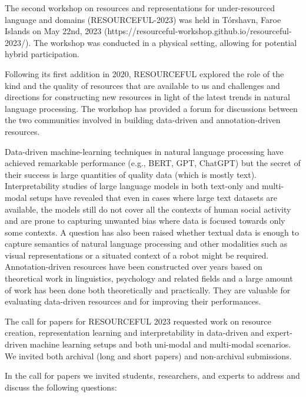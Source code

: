 The second workshop on resources and representations for under-resourced language and domains (RESOURCEFUL-2023) was held in Tórshavn, Faroe Islands on May 22nd, 2023 (https://resourceful-workshop.github.io/resourceful-2023/). The workshop was conducted in a physical setting, allowing for potential hybrid participation.

Following its first addition in 2020, RESOURCEFUL explored the role of the kind and the quality of resources that are available to us and challenges and directions for constructing new resources in light of the latest trends in natural language processing. The workshop has provided a forum for discussions between the two communities involved in building data-driven and annotation-driven resources. 

Data-driven machine-learning techniques in natural language processing have achieved remarkable performance (e.g., BERT, GPT, ChatGPT) but the secret of  their success is large quantities of quality data (which is mostly text). Interpretability studies of large language models in both text-only and multi-modal setups have revealed that even in cases where large text datasets are available, the models still do not cover all the contexts of human social activity and are prone to capturing unwanted bias where data is focused towards only some contexts. A question has also been raised whether textual data is enough to capture semantics of natural language processing and other modalities such as visual representations or a situated context of a robot might be required. Annotation-driven resources have been constructed over years based on theoretical work in linguistics, psychology and related fields and a large amount of work has been done both theoretically and practically. They are valuable for evaluating data-driven resources and for improving their performances. 

The call for papers for RESOURCEFUL 2023 requested work on resource creation, representation learning and interpretability in data-driven and expert-driven machine learning setups and both uni-modal and multi-modal scenarios. We invited both archival (long and short papers) and non-archival submissions. 

In the call for papers we invited students, researchers, and experts to address and discuss the following questions:

